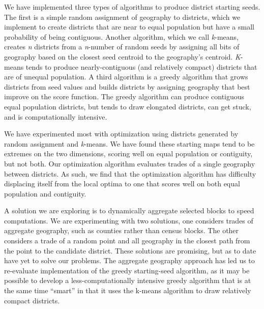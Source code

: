 \documentclass[article]{JSSstyle/jss}
\begin{document}
We have implemented three types of algorithms to produce district starting seeds.  The first is a simple random 
assignment of geography to districts, which we implement to create districts that are near to equal population but 
have a small probability of being contiguous.  Another algorithm, which we call \emph{k}-means, creates \emph{n} districts from a \emph{n}-number 
of random seeds by assigning all bits of geography based on the closest seed centroid to the geography's centroid.  \emph{K}-means tends to produce 
nearly-contiguous (and relatively compact) districts that are of unequal population.  A third algorithm is a greedy algorithm that 
grows districts from seed values and builds districts by assigning geography that best improve 
on the score function.  The greedy algorithm can produce contiguous equal population districts, 
but tends to draw elongated districts, can get stuck, and is computationally intensive.
	
We have experimented most with optimization using districts generated by 
random assignment and \emph{k}-means.  We have found these starting maps tend to be 
extremes on the two dimensions, scoring well on equal population or contiguity, but not both.  Our optimization algorithm 
evaluates trades of a single geography between districts.  As such, we find that the optimization algorithm 
has difficulty displacing itself from the local optima to one that scores well on both equal population and contiguity.
	
A solution we are exploring is to dynamically aggregate selected blocks to speed computations.  We are 
experimenting with two solutions, one considers trades of aggregate geography, such as counties rather than census blocks.  
The other considers a trade of a random point and all geography in the closest path from the point to the candidate district.  
These solutions are promising, but as to date have yet to solve our problems.  The aggregate geography approach has led us to 
re-evaluate implementation of the greedy starting-seed algorithm, as it may be possible to develop 
a less-computationally intensive greedy algorithm that is at the same time ``smart'' in that it uses the k-means algorithm to 
draw relatively compact districts. 

%
%
\end{document}
